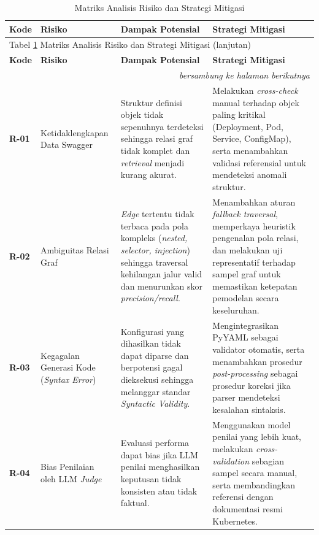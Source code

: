\renewcommand{\arraystretch}{1.25}
\captionsetup[longtable]{justification=raggedright,singlelinecheck=false}

\begin{longtable}{|p{1.2cm}|p{3cm}|p{3.8cm}|p{3.8cm}|}
\caption{Matriks Analisis Risiko dan Strategi Mitigasi}
\label{tbl:risk_matrix} \\ \hline
\textbf{Kode} & \textbf{Risiko} & \textbf{Dampak Potensial} & \textbf{Strategi Mitigasi} \\ \hline
\endfirsthead

\multicolumn{4}{l}{Tabel \ref{tbl:risk_matrix} Matriks Analisis Risiko dan Strategi Mitigasi (lanjutan)} \\ \hline
\textbf{Kode} & \textbf{Risiko} & \textbf{Dampak Potensial} & \textbf{Strategi Mitigasi} \\ \hline
\endhead

\hline
\multicolumn{4}{r}{\textit{bersambung ke halaman berikutnya}} \\
\endfoot

\hline
\endlastfoot

\textbf{R-01} &
Ketidaklengkapan Data Swagger &
Struktur definisi objek tidak sepenuhnya terdeteksi sehingga relasi graf tidak komplet dan \textit{retrieval} menjadi kurang akurat. &
Melakukan \textit{cross-check} manual terhadap objek paling kritikal (Deployment, Pod, Service, ConfigMap), serta menambahkan validasi referensial untuk mendeteksi anomali struktur. \\ \hline

\textbf{R-02} &
Ambiguitas Relasi Graf &
\textit{Edge} tertentu tidak terbaca pada pola kompleks (\textit{nested, selector, injection}) sehingga traversal kehilangan jalur valid dan menurunkan skor \textit{precision/recall}. &
Menambahkan aturan \textit{fallback traversal}, memperkaya heuristik pengenalan pola relasi, dan melakukan uji representatif terhadap sampel graf untuk memastikan ketepatan pemodelan secara keseluruhan. \\ \hline

\textbf{R-03} &
Kegagalan Generasi Kode (\textit{Syntax Error}) &
Konfigurasi yang dihasilkan tidak dapat diparse dan berpotensi gagal dieksekusi sehingga melanggar standar \textit{Syntactic Validity}. &
Mengintegrasikan PyYAML sebagai validator otomatis, serta menambahkan prosedur \textit{post-processing} sebagai prosedur koreksi jika parser mendeteksi kesalahan sintaksis. \\ \hline

\textbf{R-04} &
Bias Penilaian oleh LLM \textit{Judge} &
Evaluasi performa dapat bias jika LLM penilai menghasilkan keputusan tidak konsisten atau tidak faktual. &
Menggunakan model penilai yang lebih kuat, melakukan \textit{cross-validation} sebagian sampel secara manual, serta membandingkan referensi dengan dokumentasi resmi Kubernetes. \\ \hline


\end{longtable}
